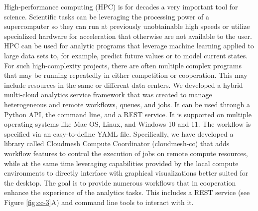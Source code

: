 \documentclass[utf8]{FrontiersinVancouver} %
\begin{document}
High-performance computing (HPC) is for decades a very important tool
for science. Scientific tasks can be leveraging the processing power
of a supercomputer so they can run at previously unobtainable high
speeds or utilize specialized hardware for acceleration that otherwise
are not available to the user. HPC can be used for analytic programs
that leverage machine learning applied to large data sets to, for
example, predict future values or to model current states. For such
high-complexity projects, there are often multiple complex programs
that may be running repeatedly in either competition or cooperation.
This may include resources in the same or different data centers. We
developed a hybrid multi-cloud analytics service framework that was
created to manage heterogeneous and remote workflows, queues, and
jobs.  It can be used through a Python API, the command line, and a
REST service. It is supported on multiple operating systems like
Mac OS, Linux, and Windows 10 and 11.  The workflow is specified via an
easy-to-define YAML file.  Specifically, we have developed a library
called Cloudmesh Compute Coordinator (cloudmesh-cc)
\citep{las-22-arxiv-workflow-cc} that adds workflow features to
control the execution of jobs on remote compute resources, while at
the same time leveraging capabilities provided by the local compute
environments to directly interface with graphical visualizations better
suited for the desktop. The goal is to provide numerous workflows that
in cooperation enhance the experience of the analytics tasks. This
includes a REST service (see Figure \ref{fig:cc-3}A) and command line
tools to interact with it.
\end{document}
